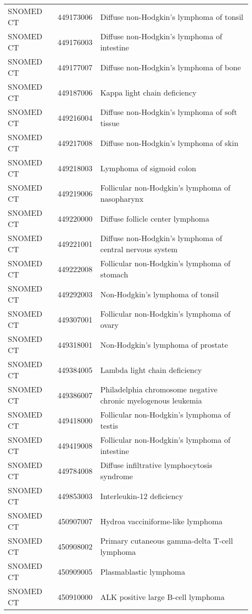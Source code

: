 \begin{longtable}{p{}p{}p{}}
  SNOMED CT & 449173006 & Diffuse non-Hodgkin's lymphoma of tonsil \\ 
  SNOMED CT & 449176003 & Diffuse non-Hodgkin's lymphoma of intestine \\ 
  SNOMED CT & 449177007 & Diffuse non-Hodgkin's lymphoma of bone \\ 
  SNOMED CT & 449187006 & Kappa light chain deficiency \\ 
  SNOMED CT & 449216004 & Diffuse non-Hodgkin's lymphoma of soft tissue \\ 
  SNOMED CT & 449217008 & Diffuse non-Hodgkin's lymphoma of skin \\ 
  SNOMED CT & 449218003 & Lymphoma of sigmoid colon \\ 
  SNOMED CT & 449219006 & Follicular non-Hodgkin's lymphoma of nasopharynx \\ 
  SNOMED CT & 449220000 & Diffuse follicle center lymphoma \\ 
  SNOMED CT & 449221001 & Diffuse non-Hodgkin's lymphoma of central nervous system \\ 
  SNOMED CT & 449222008 & Follicular non-Hodgkin's lymphoma of stomach \\ 
  SNOMED CT & 449292003 & Non-Hodgkin's lymphoma of tonsil \\ 
  SNOMED CT & 449307001 & Follicular non-Hodgkin's lymphoma of ovary \\ 
  SNOMED CT & 449318001 & Non-Hodgkin's lymphoma of prostate \\ 
  SNOMED CT & 449384005 & Lambda light chain deficiency \\ 
  SNOMED CT & 449386007 & Philadelphia chromosome negative chronic myelogenous leukemia \\ 
  SNOMED CT & 449418000 & Follicular non-Hodgkin's lymphoma of testis \\ 
  SNOMED CT & 449419008 & Follicular non-Hodgkin's lymphoma of intestine \\ 
  SNOMED CT & 449784008 & Diffuse infiltrative lymphocytosis syndrome \\ 
  SNOMED CT & 449853003 & Interleukin-12 deficiency \\ 
  SNOMED CT & 450907007 & Hydroa vacciniforme-like lymphoma \\ 
  SNOMED CT & 450908002 & Primary cutaneous gamma-delta T-cell lymphoma \\ 
  SNOMED CT & 450909005 & Plasmablastic lymphoma \\ 
  SNOMED CT & 450910000 & ALK positive large B-cell lymphoma \\ 

\end{longtable}
